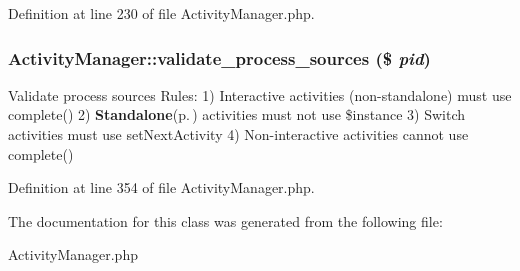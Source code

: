 Definition at line 230 of file Activity\-Manager.php.
\subsubsection{\setlength{\rightskip}{0pt plus 5cm}Activity\-Manager::validate\_\-process\_\-sources (\$ {\em pid})}\label{classActivityManager_a14}


Validate process sources Rules: 1) Interactive activities (non-standalone) must use complete() 2) {\bf Standalone}{\rm (p.\,\pageref{classStandalone})} activities must not use \$instance 3) Switch activities must use set\-Next\-Activity 4) Non-interactive activities cannot use complete() 

Definition at line 354 of file Activity\-Manager.php.

The documentation for this class was generated from the following file:\begin{CompactItemize}
\item 
Activity\-Manager.php\end{CompactItemize}
